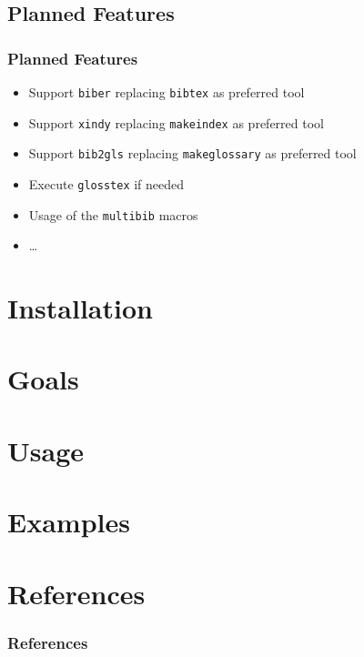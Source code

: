 \subsection{Planned Features}

\begin{frame}
  \frametitle{Planned Features}
  \begin{itemize}
  
    \item Support \texttt{biber} replacing \texttt{bibtex} as preferred tool
  \item Support \texttt{xindy} replacing \texttt{makeindex} as preferred tool
    \item Support \texttt{bib2gls} replacing \texttt{makeglossary} as preferred tool
    \item Execute \texttt{glosstex} if needed
    \item Usage of the \texttt{multibib} macros
    \item \dots
  \end{itemize}
\end{frame}

\section{Installation}

\section{Goals}

\section{Usage}

\section{Examples}

\section{References}


\begin{frame}[allowframebreaks]
  \frametitle{References}
  {}
\end{frame}

